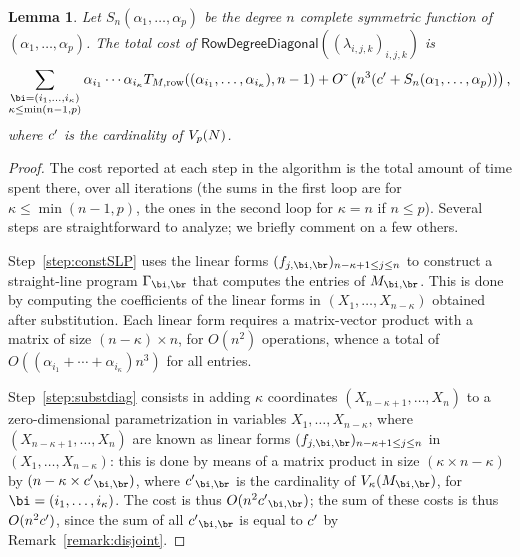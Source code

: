 \documentclass[12pt]{article}
\newtheorem{lemma}[definition]{Lemma}
\begin{document}
\begin{lemma}\label{lemma:rowdegreediagonal}
  Let $S_n(\alpha_1,\dots,\alpha_p)$ be the degree $n$ complete
  symmetric function of $(\alpha_1,\dots,\alpha_p)$.  The total cost of
  $\mathsf{RowDegreeDiagonal}((\lambda_{i,j,k})_{i,j,k})$
  is $$\sum_{\substack{\bi=(i_1,\dots,i_\kappa)\\ \kappa\le\min(n-1,p)}}
  \alpha_{i_1} \cdots \alpha_{i_\kappa} T_{M,{\rm
      row}}((\alpha_{i_1},\dots,\alpha_{i_\kappa}), n-1) + \softO\left (n^3(\rc + S_n(\alpha_1,\dots,\alpha_p))  \right),$$
  where ${c'}{}$ is the cardinality of $V_p({N})$.
\end{lemma}
\begin{proof}
  The cost reported at each step in the algorithm is the total amount
  of time spent there, over all iterations (the sums in the first loop
  are for $\kappa \le \min(n-1,p)$, the ones in the second loop for
  $\kappa=n$ if $n \le p$). Several steps are straightforward to
  analyze; we briefly comment on a few others.

  Step~\ref{step:constSLP} uses the linear forms
  $(f_{j,\bi,\br})_{n-\kappa+1 \le j \le n}$ to construct a
  straight-line program $\Gamma_{\bi,\br}$ that computes the entries
  of $\mM_{\bi,\br}$. This is done by computing the coefficients
  of the linear forms in $(X_1,\dots,X_{n-\kappa})$ obtained after 
  substitution. Each linear form requires a matrix-vector product 
  with a matrix of size $(n-\kappa) \times n$, for $O(n^2)$ operations,
  whence a total of $O((\alpha_{i_1} + \cdots +\alpha_{i_\kappa})n^3)$
  for all entries.

  Step~\ref{step:substdiag} consists in adding $\kappa$ coordinates
  $(X_{n-\kappa+1},\dots,X_n)$ to a zero-dimensional parametrization
  in variables $X_1,\dots,X_{n-\kappa}$, where
  $(X_{n-\kappa+1},\dots,X_n)$ are known as linear forms
  $(f_{j,\bi,\br})_{n-\kappa+1 \le j \le n}$ in $(X_1, \ldots,
  X_{n-\kappa})$: this is done by means of a matrix product in size
  $(\kappa \times n-\kappa)$ by $(n-\kappa \times \rc_{\bi,\br})$, where
  $\rc_{\bi,\br}$ is the cardinality of $V_\kappa(\mM_{\bi,\br})$, for
  $\bi=(i_1,\dots,i_\kappa)$.  The cost is thus $O(n^2 \rc_{\bi,\br})$;
  the sum of these costs is thus $O(n^2 {c'}{})$, since the sum of all
  $\rc_{\bi,\br}$ is equal to ${c'}{}$ by Remark~\ref{remark:disjoint}.


\end{proof}
\end{document}
